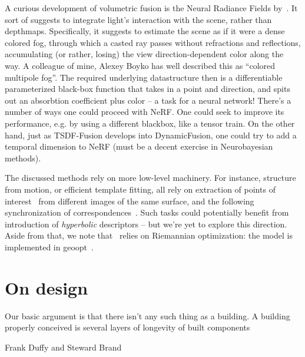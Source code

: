 A curious development of volumetric fusion is the Neural Radiance Fields
by~\citet{nerf}. It sort of suggests to integrate light's interaction with the
scene, rather than depthmaps.  Specifically, it suggests to estimate the scene
as if it were a dense colored fog, through which a casted ray passes without
refractions and reflections, accumulating (or rather, losing) the view
direction-dependent color along the way. A colleague of mine, Alexey Boyko has
well described this as ``colored multipole fog''. The required underlying
datastructure then is a differentiable parameterized black-box function that
takes in a point and direction, and spits out an absorbtion coefficient plus
color -- a task for a neural network!
There's a number of ways one could proceed with NeRF. One could seek to improve
its performance, e.g. by using a different blackbox, like a tensor train.  On
the other hand, just as TSDF-Fusion develops into DynamicFusion, one could try
to add a temporal dimension to NeRF (must be a decent exercise in Neurobayesian
methods).

The discussed methods rely on more low-level machinery. For instance,
structure from motion, or efficient template fitting, all rely on extraction of
points of interest~\cite{r2d2} from different images of the same surface, and
the following synchronization of correspondences~\cite{birdalCorrespondences}.
Such tasks could potentially benefit from introduction of \emph{hyperbolic}
descriptors -- but we're yet to explore this direction. Aside from that, we
note that~\citet{birdalCorrespondences} relies on Riemannian optimization:
the model is implemented in geoopt~\cite{geoopt}.

\section{On design}

\epigraph{Our basic argument is that there isn't any such thing as a
    building.  A building properly conceived is several layers of longevity of
    built components}{Frank Duffy and Steward Brand~\cite{hbLearn}}

